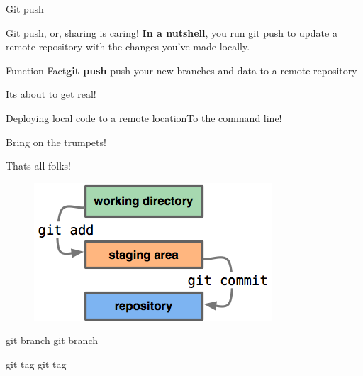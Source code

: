 \documentclass{beamer}
\newcommand{\demo}[1]{\begin{frame}{Its about to get real!}\begin{exampleblock}{#1}To the command line!\end{exampleblock}\end{frame}}
\newcommand{\clfact}[2]{\begin{alertblock}{Function Fact}\textbf{#1} #2\end{alertblock}}
\begin{document}
\begin{frame}{Git push}
    \begin{block}{Git push, or, sharing is caring!}
    \textbf{In a nutshell}, you run git push to update a remote repository with the changes you've made locally. 
    
    \end{block}
    \clfact{git push}{push your new branches and data to a remote repository}
\end{frame}
\demo{Deploying local code to a remote location}

\begin{frame}{Bring on the trumpets!}
    \begin{block}{Thats all folks!}

    \begin{figure}[ht]
        \centering
        \includegraphics[width=0.5\linewidth]{img/staging.png}
        \label{fig:figure3}
    \end{figure}
    \end{block}
\end{frame}

\begin{frame}{git branch}
    git branch
\end{frame}

\begin{frame}{git tag}
    git tag
\end{frame}
\end{document}
